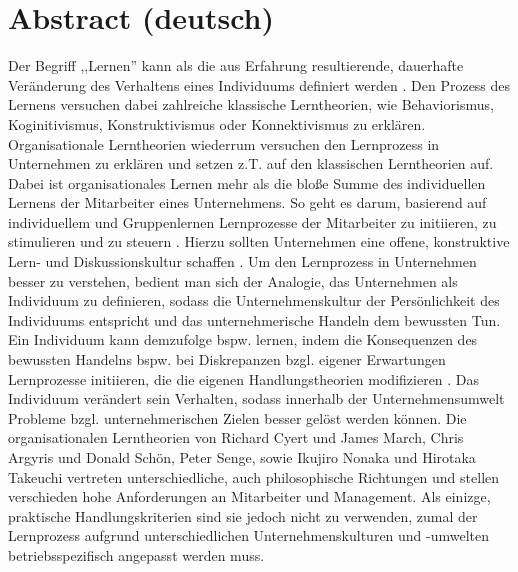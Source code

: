 \documentclass[12pt]{article}
\begin{document}
\maketitle

\section{Abstract (deutsch)}

Der Begriff ,,Lernen'' kann als die aus Erfahrung resultierende, dauerhafte
Veränderung des Verhaltens eines Individuums definiert werden
\cite{Lefrancois:2006}. Den Prozess des Lernens versuchen dabei zahlreiche
klassische Lerntheorien, wie Behaviorismus, Koginitivismus, Konstruktivismus
oder Konnektivismus zu erklären. Organisationale Lerntheorien wiederrum
versuchen den Lernprozess in Unternehmen zu erklären und setzen z.T. auf den
klassischen Lerntheorien auf. Dabei ist organisationales Lernen mehr als die
bloße Summe des individuellen Lernens der Mitarbeiter eines Unternehmens. So
geht es darum, basierend auf individuellem und Gruppenlernen Lernprozesse der
Mitarbeiter zu initiieren, zu stimulieren und zu steuern \cite{Franken:2002}.
Hierzu sollten Unternehmen eine offene, konstruktive Lern- und
Diskussionskultur schaffen \cite{culture}.
Um den Lernprozess in Unternehmen besser zu verstehen, bedient man sich der
Analogie, das Unternehmen als Individuum zu definieren, sodass die
Unternehmenskultur der Persönlichkeit des Individuums entspricht und das
unternehmerische Handeln dem bewussten Tun. Ein Individuum kann demzufolge
bspw. lernen, indem die Konsequenzen des bewussten Handelns bspw. bei
Diskrepanzen bzgl. eigener Erwartungen Lernprozesse initiieren, die die eigenen
Handlungstheorien modifizieren \cite{Pawlowsky:1992}. Das Individuum verändert
sein Verhalten, sodass innerhalb der Unternehmensumwelt Probleme bzgl.
unternehmerischen Zielen besser gelöst werden können. Die organisationalen
Lerntheorien von Richard Cyert und James March, Chris Argyris und Donald Schön,
Peter Senge, sowie Ikujiro Nonaka und Hirotaka Takeuchi vertreten
unterschiedliche, auch philosophische Richtungen und stellen verschieden hohe
Anforderungen an Mitarbeiter und Management. Als einizge, praktische
Handlungskriterien sind sie jedoch nicht zu verwenden, zumal der Lernprozess
aufgrund unterschiedlichen Unternehmenskulturen und -umwelten
betriebsspezifisch angepasst werden muss.
\end{document}
